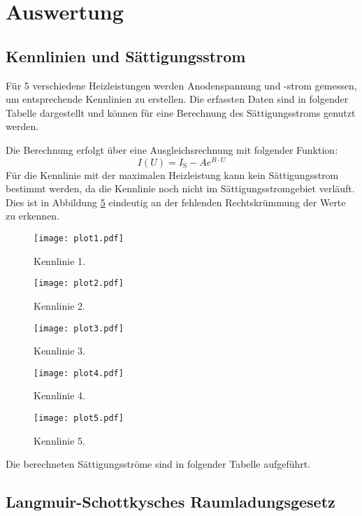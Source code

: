 \section{Auswertung}
\label{sec:Auswertung}

\subsection{Kennlinien und Sättigungsstrom}
\label{sec:str}

Für 5 verschiedene Heizleistungen werden Anodenspannung und -strom gemessen, um entsprechende Kennlinien zu erstellen.
Die erfassten Daten sind in folgender Tabelle dargestellt und können für eine Berechnung des Sättigungsstroms genutzt werden.

Die Berechnung erfolgt über eine Ausgleichsrechnung mit folgender Funktion:
\begin{equation}
  I(U) = I_\text{S} - A e^{B \cdot U}
\end{equation}
Für die Kennlinie mit der maximalen Heizleistung kann kein Sättigungsstrom bestimmt werden, da die Kennlinie noch nicht im Sättigungsstromgebiet verläuft.
Dies ist in Abbildung \ref{fig:plot5} eindeutig an der fehlenden Rechtskrümmung der Werte zu erkennen.
\begin{figure}
  \centering
  \texttt{[image: plot1.pdf]}
  \caption{Kennlinie 1.}
  \label{fig:plot1}
\end{figure}
\begin{figure}
  \centering
  \texttt{[image: plot2.pdf]}
  \caption{Kennlinie 2.}
  \label{fig:plot2}
\end{figure}
\begin{figure}
  \centering
  \texttt{[image: plot3.pdf]}
  \caption{Kennlinie 3.}
  \label{fig:plot3}
\end{figure}
\begin{figure}
  \centering
  \texttt{[image: plot4.pdf]}
  \caption{Kennlinie 4.}
  \label{fig:plot4}
\end{figure}
\begin{figure}
  \centering
  \texttt{[image: plot5.pdf]}
  \caption{Kennlinie 5.}
  \label{fig:plot5}
\end{figure}
\noindent
Die berechneten Sättigungsströme sind in folgender Tabelle aufgeführt.

\subsection{Langmuir-Schottkysches Raumladungsgesetz}
\label{sec:expo}

